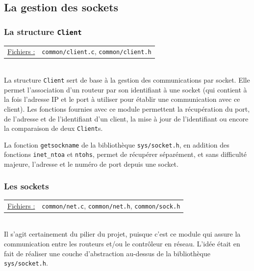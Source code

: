 \documentclass[a4paper,11pt]{article}
\begin{document}
\subsection{La gestion des sockets}

\subsubsection{La structure \texttt{Client}}

\begin{tabularx}{\linewidth}{lX}
\underline{Fichiers :} & \texttt{common/client.c}, \texttt{common/client.h}\\
\end{tabularx}\\

La structure \texttt{Client} sert de base à la gestion des communications par socket. Elle permet l'association d'un routeur par son identifiant à une socket (qui contient à la fois l'adresse IP et le port à utiliser pour établir une communication avec ce client). Les fonctions fournies avec ce module permettent la récupération du port, de l'adresse et de l'identifiant d'un client, la mise à jour de l'identifiant ou encore la comparaison de deux \texttt{Client}s.

La fonction \texttt{getsockname} de la bibliothèque \texttt{sys/socket.h}, en addition des fonctions \texttt{inet\_ntoa} et \texttt{ntohs}, permet de récupérer séparément, et sans difficulté majeure, l'adresse et le numéro de port depuis une socket.

\subsubsection{Les sockets}

\begin{tabularx}{\linewidth}{lX}
\underline{Fichiers :} & \texttt{common/net.c}, \texttt{common/net.h}, \texttt{common/sock.h}\\
\end{tabularx}\\

Il s'agit certainement du pilier du projet, puisque c'est ce module qui assure la communication entre les routeurs et/ou le contrôleur en réseau. L'idée était en fait de réaliser une couche d'abstraction au-dessus de la bibliothèque \texttt{sys/socket.h}.
\end{document}
